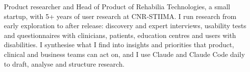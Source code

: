 {Product researcher and Head of Product of Rehabilia Technologies, a small startup, with 5+ years of user research at CNR-STIIMA. I run research from early exploration to after release: discovery and expert interviews, usability tests and questionnaires with clinicians, patients, education centres and users with disabilities. I synthesise what I find into insights and priorities that product, clinical and business teams can act on, and I use Claude and Claude Code daily to draft, analyse and structure research.}
